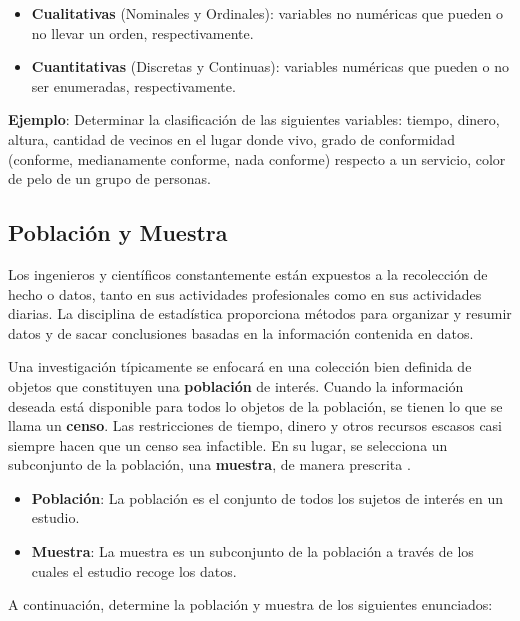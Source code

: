 \documentclass[
]{book}
\providecommand{\tightlist}{%
  \setlength{\itemsep}{0pt}\setlength{\parskip}{0pt}}
\begin{document}
\begin{itemize}
\tightlist
\item
  \textbf{Cualitativas} (Nominales y Ordinales): variables no numéricas que pueden o no llevar un orden, respectivamente.
\item
  \textbf{Cuantitativas} (Discretas y Continuas): variables numéricas que pueden o no ser enumeradas, respectivamente.
\end{itemize}

\textbf{Ejemplo}: Determinar la clasificación de las siguientes variables: tiempo, dinero, altura, cantidad de vecinos en el lugar donde vivo, grado de conformidad (conforme, medianamente conforme, nada conforme) respecto a un servicio, color de pelo de un grupo de personas.

\hypertarget{poblaciuxf3n-y-muestra}{%
\subsection{Población y Muestra}\label{poblaciuxf3n-y-muestra}}

Los ingenieros y científicos constantemente están expuestos a la recolección de hecho o datos, tanto en sus actividades profesionales como en sus actividades diarias. La disciplina de estadística proporciona métodos para organizar y resumir datos y de sacar conclusiones basadas en la información contenida en datos.

Una investigación típicamente se enfocará en una colección bien definida de objetos que constituyen una \textbf{población} de interés. Cuando la información deseada está disponible para todos lo objetos de la población, se tienen lo que se llama un \textbf{censo}. Las restricciones de tiempo, dinero y otros recursos escasos casi siempre hacen que un censo sea infactible. En su lugar, se selecciona un subconjunto de la población, una \textbf{muestra}, de manera prescrita \citep[paǵina 2]{Devore}.

\begin{itemize}
\tightlist
\item
  \textbf{Población}: La población es el conjunto de todos los sujetos de interés en un estudio.
\item
  \textbf{Muestra}: La muestra es un subconjunto de la población a través de los cuales el estudio recoge los datos.
\end{itemize}

A continuación, determine la población y muestra de los siguientes enunciados:
\end{document}
